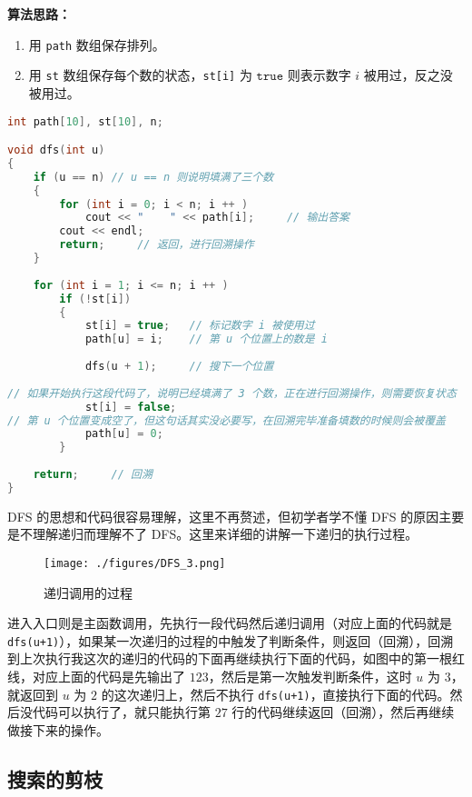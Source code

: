 \textbf{算法思路：}
\begin{enumerate}
\item 用 \verb|path| 数组保存排列。

\item 用 \verb|st| 数组保存每个数的状态，\verb|st[i]| 为 $\mathtt{true}$ 则表示数字 $i$ 被用过，反之没被用过。

\end{enumerate}
\begin{lstlisting}[language=cpp]
int path[10], st[10], n;

void dfs(int u)
{
    if (u == n) // u == n 则说明填满了三个数
    {
        for (int i = 0; i < n; i ++ )
            cout << "    " << path[i];     // 输出答案
        cout << endl;
        return;     // 返回，进行回溯操作
    }
    
    for (int i = 1; i <= n; i ++ )
        if (!st[i])
        {
            st[i] = true;   // 标记数字 i 被使用过
            path[u] = i;    // 第 u 个位置上的数是 i
            
            dfs(u + 1);     // 搜下一个位置
            
// 如果开始执行这段代码了，说明已经填满了 3 个数，正在进行回溯操作，则需要恢复状态
            st[i] = false;  
// 第 u 个位置变成空了，但这句话其实没必要写，在回溯完毕准备填数的时候则会被覆盖
            path[u] = 0;    
        }
        
    return;     // 回溯
}
\end{lstlisting}

DFS 的思想和代码很容易理解，这里不再赘述，但初学者学不懂 DFS 的原因主要是不理解递归而理解不了 DFS。这里来详细的讲解一下递归的执行过程。

\begin{figure}[ht]
\centering
\texttt{[image: ./figures/DFS\_3.png]}
\caption{递归调用的过程} \label{DFS_fig3}
\end{figure}


进入入口则是主函数调用，先执行一段代码然后递归调用（对应上面的代码就是 \verb|dfs(u+1)|），如果某一次递归的过程的中触发了判断条件，则返回（回溯），回溯到上次执行我这次的递归的代码的下面再继续执行下面的代码，如图中的第一根红线，对应上面的代码是先输出了 $1 2 3$，然后是第一次触发判断条件，这时 $u$ 为 $3$，就返回到 $u$ 为 $2$ 的这次递归上，然后不执行 \verb|dfs(u+1)|，直接执行下面的代码。然后没代码可以执行了，就只能执行第 $27$ 行的代码继续返回（回溯），然后再继续做接下来的操作。


\subsection{搜索的剪枝}

